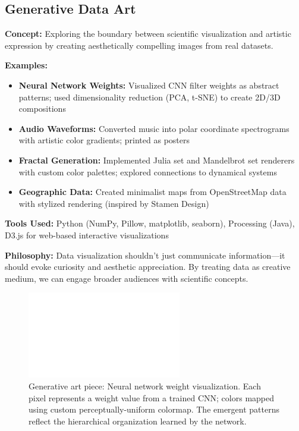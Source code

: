 
\subsection*{Generative Data Art}

\textbf{Concept:} Exploring the boundary between scientific visualization and artistic expression by creating aesthetically compelling images from real datasets.

\vspace{0.5em}

\textbf{Examples:}

\begin{itemize}[leftmargin=1.2em, itemsep=0.1em]
  \item \textbf{Neural Network Weights:} Visualized CNN filter weights as abstract patterns; used dimensionality reduction (PCA, t-SNE) to create 2D/3D compositions
  \item \textbf{Audio Waveforms:} Converted music into polar coordinate spectrograms with artistic color gradients; printed as posters
  \item \textbf{Fractal Generation:} Implemented Julia set and Mandelbrot set renderers with custom color palettes; explored connections to dynamical systems
  \item \textbf{Geographic Data:} Created minimalist maps from OpenStreetMap data with stylized rendering (inspired by Stamen Design)
\end{itemize}

\vspace{0.5em}

\textbf{Tools Used:} Python (NumPy, Pillow, matplotlib, seaborn), Processing (Java), D3.js for web-based interactive visualizations

\vspace{0.5em}

\textbf{Philosophy:} Data visualization shouldn't just communicate information—it should evoke curiosity and aesthetic appreciation. By treating data as creative medium, we can engage broader audiences with scientific concepts.

\begin{figure}[h]
\centering
\includegraphics[width=0.6\textwidth]{assets/placeholder_1600x900.png}
\caption{Generative art piece: Neural network weight visualization. Each pixel represents a weight value from a trained CNN; colors mapped using custom perceptually-uniform colormap. The emergent patterns reflect the hierarchical organization learned by the network.}
\end{figure}

